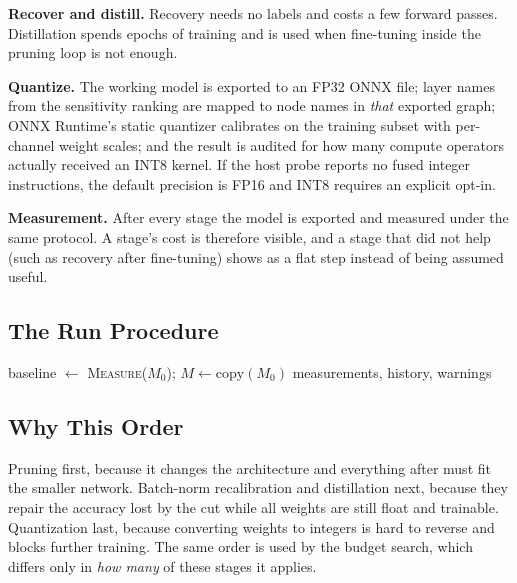 \documentclass[oneside,a4paper,12pt]{report}
\newcommand{\code}[1]{\texttt{\small #1}}
\begin{document}
\textbf{Recover and distill.} Recovery needs no labels and costs a few forward passes. Distillation spends epochs of training and is used when fine-tuning inside the pruning loop is not enough.

\textbf{Quantize.} The working model is exported to an FP32 ONNX file; layer names from the sensitivity ranking are mapped to node names in \emph{that} exported graph; ONNX Runtime's static quantizer calibrates on the training subset with per-channel weight scales; and the result is audited for how many compute operators actually received an INT8 kernel. If the host probe reports no fused integer instructions, the default precision is FP16 and INT8 requires an explicit opt-in.

\textbf{Measurement.} After every stage the model is exported and measured under the same protocol. A stage's cost is therefore visible, and a stage that did not help (such as recovery after fine-tuning) shows as a flat step instead of being assumed useful.

\subsection{The Run Procedure}
\begin{algorithm}[H]
\caption{\code{Pipeline.run}}\label{alg:run}
baseline $\gets$ \textsc{Measure}($M_0$); $M \gets \mathrm{copy}(M_0)$\;
\Return measurements, history, warnings\;
\end{algorithm}

\subsection{Why This Order}
Pruning first, because it changes the architecture and everything after must fit the smaller network. Batch-norm recalibration and distillation next, because they repair the accuracy lost by the cut while all weights are still float and trainable. Quantization last, because converting weights to integers is hard to reverse and blocks further training. The same order is used by the budget search, which differs only in \emph{how many} of these stages it applies.
\end{document}

